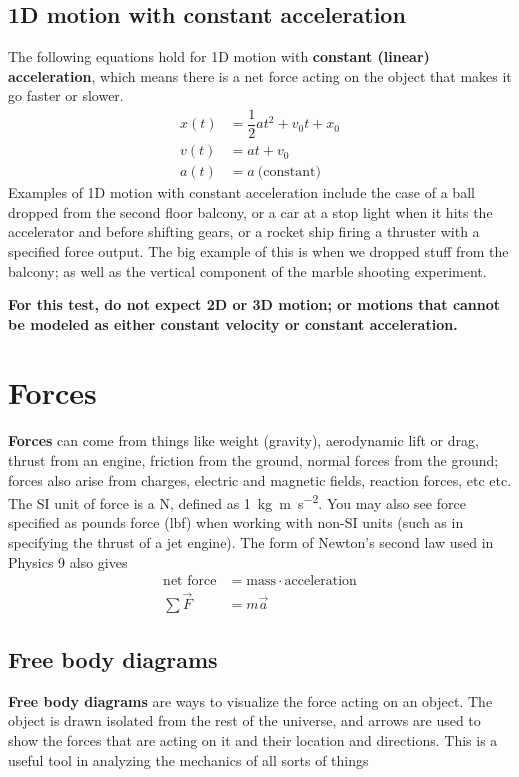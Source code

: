 \documentclass [handout]{tufte-handout}
\begin{document}
\subsection{1D motion with constant acceleration}
The following equations hold for 1D motion with \textbf{constant (linear) acceleration}, which means there is a net force acting on the object that makes it go faster or slower. 
\begin{align}
x(t) &= \dfrac{1}{2} a t^2 + v_0 t + x_0 \\
v(t) &= at + v_0 \\
a(t) &= a\ \text{(constant)} 
\end{align}
Examples of 1D motion with constant acceleration include the case of a ball dropped from the second floor balcony, or a car at a stop light when it hits the accelerator and before shifting gears, or a rocket ship firing a thruster with a specified force output. The big example of this is when we dropped stuff from the balcony; as well as the vertical component of the marble shooting experiment. 

\textbf{For this test, do not expect 2D or 3D motion; or motions that cannot be modeled as either constant velocity or constant acceleration.}

\section{Forces}
\textbf{Forces} can come from things like weight (gravity), aerodynamic lift or drag, thrust from an engine, friction from the ground, normal forces from the ground; forces also arise from charges, electric and magnetic fields, reaction forces, etc etc. The SI unit of force is a \si{\newton}, defined as \SI{1}{\kilo\gram\meter\per\second\squared}. You may also see force specified as pounds force (lbf) when working with non-SI units (such as in specifying the thrust of a jet engine). The form of Newton's second law used in Physics 9 also gives 
\begin{align}
\text{net force} &= \text{mass} \cdot \text{acceleration} \\
\sum\vec{F} &= m\vec{a}
\end{align}

\subsection{Free body diagrams}
\textbf{Free body diagrams} are ways to visualize the force acting on an object. The object is drawn isolated from the rest of the universe, and arrows are used to show the forces that are acting on it and their location and directions. This is a useful tool in analyzing the mechanics of all sorts of things
\end{document}
